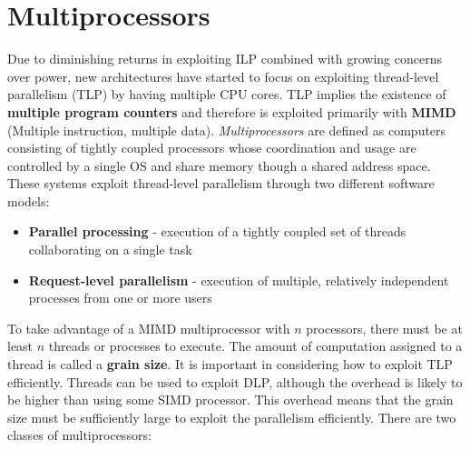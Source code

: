 \documentclass[11pt]{article}
\begin{document}
\section{Multiprocessors}
Due to diminishing returns in exploiting ILP combined with growing concerns over power, new architectures have started to focus on exploiting thread-level parallelism (TLP) by having multiple CPU cores.
\n
TLP implies the existence of \textbf{multiple program counters} and therefore is exploited primarily with \textbf{MIMD} (Multiple instruction, multiple data). \textit{Multiprocessors} are defined as computers consisting of tightly coupled processors whose coordination and usage are controlled by a single OS and share memory though a shared address space. These systems exploit thread-level parallelism through two different software models:
\begin{itemize}
\item \textbf{Parallel processing} - execution of a tightly coupled set of threads collaborating on a single task
\item \textbf{Request-level parallelism} - execution of multiple, relatively independent processes from one or more users
\end{itemize}
To take advantage of a MIMD multiprocessor with $n$ processors, there must be at least $n$ threads or processes to execute. The amount of computation assigned to a thread is called a \textbf{grain size}. It is important in considering how to exploit TLP efficiently. Threads can be used to exploit DLP, although the overhead is likely to be higher than using some SIMD processor. This overhead means that the grain size must be sufficiently large to exploit the parallelism efficiently. 
\n
There are two classes of multiprocessors:
\end{document}
